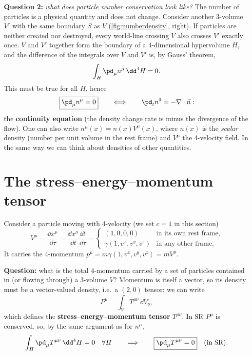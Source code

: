 \textbf{Question 2:} \emph{what does particle number conservation look like?} The number of particles is a physical quantity and does not change. Consider another 3-volume $V'$ with the same boundary $S$ as $V$ (\cref{fig:numberdensity}, right). If particles are neither created nor destroyed, every world-line crossing $V$ also crosses $V'$ exactly once. $V$ and $V'$ together form the boundary of a 4-dimensional hypervolume $H$, and the difference of the integrals over $V$ and $V'$ is, by Gauss' theorem,
\begin{equation}
  \int_H\pd_\mu n^\mu\,\dd^4H=0 .
\end{equation}
This must be true for all $H$, hence
\begin{equation}
  \boxed{\pd_\mu n^\mu=0}\qquad\Longleftrightarrow\qquad\pd_t n^0=-\nabla\cdot\vec n :
\end{equation}
the \textbf{continuity equation} (the density change rate is minus the divergence of the flow). One can also write $n^\mu(x)=n(x)V^\mu(x)$, where $n(x)$ is the \emph{scalar} density (number per unit volume in the rest frame) and $V^\mu$ the 4-velocity field. In the same way we can think about densities of other quantities.

\section{The stress--energy--momentum tensor}

Consider a particle moving with 4-velocity (we set $c=1$ in this section)
\begin{equation}
  V^\mu=\frac{\dd x^\mu}{\dd\tau}=\frac{\dd x^\mu}{\dd t}\frac{\dd t}{\dd\tau}=\begin{cases}(1,0,0,0)&\text{in its own rest frame},\\ \gamma(1,v^x,v^y,v^z)&\text{in any other frame.}\end{cases}
\end{equation}
It carries the 4-momentum $p^\mu=m\gamma(1,v^x,v^y,v^z)=mV^\mu$.

\textbf{Question:} what is the total 4-momentum carried by a set of particles contained in (or flowing through) a 3-volume $V$? Momentum is itself a vector, so its density must be a vector-valued density, i.e.\ a $(2,0)$ tensor: we can write
\begin{equation}
  P^\mu=\int_V T^{\mu\nu}\,\dd V_\nu ,
\end{equation}
which defines the \textbf{stress--energy--momentum tensor} $T^{\mu\nu}$. In SR $P^\mu$ is conserved, so, by the same argument as for $n^\mu$,
\begin{equation}
  \int_H\pd_\mu T^{\mu\nu}\,\dd^4H=0\quad\forall H\qquad\Longrightarrow\qquad\boxed{\pd_\mu T^{\mu\nu}=0}\quad\text{(in SR)}.
\end{equation}

